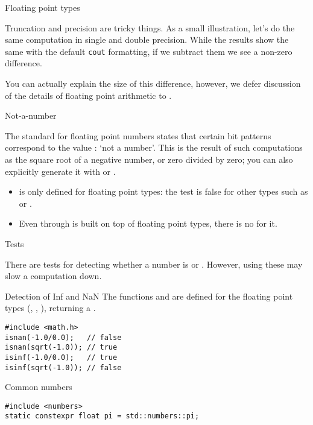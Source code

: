 
 {Floating point types}

Truncation and precision are tricky things.
As a small illustration, let's do the same computation
in single and double precision.
While the results show the same with the default \lstinline{cout}
formatting,
if we subtract them we see a non-zero difference.


You can actually explain the size of this difference,
however, we defer discussion of the details
of floating point arithmetic to
.

 {Not-a-number}
\label{sec:naninf}

The  standard for floating point numbers
states that certain bit patterns correspond to the value
: `not a number'.
This is the result of such computations as the square root
of a negative number, or zero divided by zero;
you can also explicitly generate it
with  or .

\begin{itemize}
\item {} is only defined for floating point types:
  the test  is false for other types
  such as  or .
\item Even through  is built on top of
  floating point types, there is no  for it.
\end{itemize}


 {Tests}

There are tests for detecting whether a number is  or
. However, using these may slow a computation down.

\begin{block}{Detection of Inf and NaN}
  The functions  and  are
  defined for the floating point types (, , ), returning a .
\begin{lstlisting}
#include <math.h>
isnan(-1.0/0.0);   // false
isnan(sqrt(-1.0)); // true
isinf(-1.0/0.0);   // true
isinf(sqrt(-1.0)); // false
\end{lstlisting}
\end{block}

 {Common numbers}
\label{sec:std-numbers}

\begin{lstlisting}
#include <numbers>
static constexpr float pi = std::numbers::pi;
\end{lstlisting}

